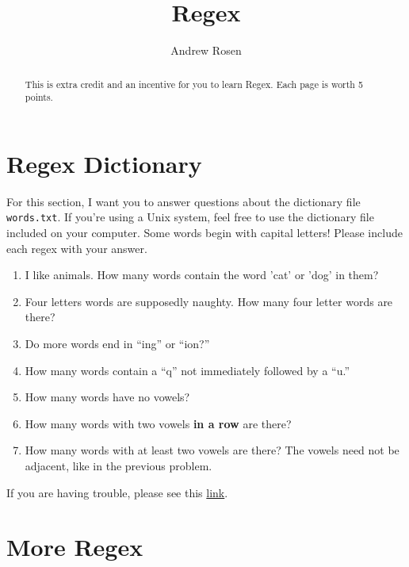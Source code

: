 \documentclass[12pt,letterpaper]{article}
\author{Andrew Rosen}
\title{Regex}
\begin{document}
    
    
    
    \maketitle
    
    
    \begin{abstract}
    	This is extra credit and an incentive for you to learn Regex.  Each page is worth 5 points.
    \end{abstract}
    
    \section{Regex Dictionary}
    For this section, I want you to answer questions about the dictionary file \texttt{words.txt}.  If you're using a Unix system, feel free to use the dictionary file included on your computer.
    Some words begin with capital letters!
    Please include each regex with your answer.
    \begin{enumerate}
    	\item I like animals.  How many words contain the word 'cat' or 'dog' in them?
    	\item Four letters words are supposedly naughty.  How many four letter words are there?
        \item Do more words end in ``ing'' or ``ion?''
        \item How many words contain a ``q'' not immediately followed by a ``u.''
        \item How many words have no vowels?
        \item How many words with two vowels \textbf{in a row} are there?
        \item How many words with at least two vowels are there?  The vowels need not be adjacent, like in the previous problem.
    \end{enumerate}
    
    
    If you are having trouble, please see this \href{http://www.regexr.com/}{link}.
    
    \newpage
    \section{More Regex}
    
\end{document}

